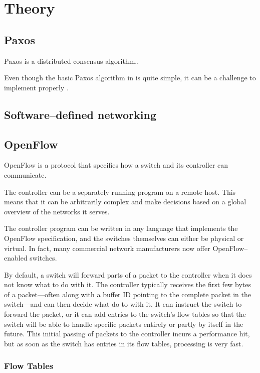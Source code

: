 \chapter{Theory}

\section{Paxos}
Paxos is a distributed consensus algorithm..

Even though the basic Paxos algorithm in \cite{Lam01} is quite simple, it can be
a challenge to implement properly \cite{Chandra:2007:PML:1281100.1281103}.
\section{Software--defined networking}

\section{OpenFlow}
OpenFlow is a protocol that specifies how a switch and its controller can
communicate.

The controller can be a separately running program on a remote host. This
means that it can be arbitrarily complex and make decisions based on a
global overview of the networks it serves.

The controller program can be written in any language that implements the
OpenFlow specification, and the switches themselves can either be physical
or virtual.  In fact, many commercial network manufacturers now offer
OpenFlow--enabled switches.

By default, a switch will forward parts of a packet to the controller when
it does not know what to do with it.  The controller typically receives the
first few bytes of a packet---often along with a buffer ID pointing to the
complete packet in the switch---and can then decide what do to with it.  It
can instruct the switch to forward the packet, or it can add entries to the
switch's flow tables so that the switch will be able to handle specific
packets entirely or partly by itself in the future.  This initial passing of
packets to the controller incurs a performance hit, but as soon as the
switch has entries in its flow tables, processing is very fast.

\subsection{Flow Tables}

